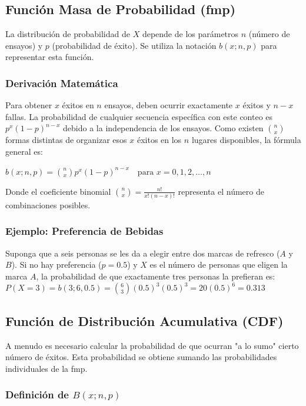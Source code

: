 \documentclass[a4paper]{article}
\begin{document}
\subsection{Función Masa de Probabilidad (fmp)}

La distribución de probabilidad de $X$ depende de los parámetros $n$ (número de ensayos) y $p$ (probabilidad de éxito). Se utiliza la notación $b(x; n, p)$ para representar esta función.

\subsubsection{Derivación Matemática}

Para obtener $x$ éxitos en $n$ ensayos, deben ocurrir exactamente $x$ éxitos y $n - x$ fallas. La probabilidad de cualquier secuencia específica con este conteo es $p^x(1 - p)^{n-x}$ debido a la independencia de los ensayos. Como existen $\binom{n}{x}$ formas distintas de organizar esos $x$ éxitos en los $n$ lugares disponibles, la fórmula general es:

$b(x; n, p) = \binom{n}{x} p^x (1 - p)^{n-x} \quad \text{para } x = 0, 1, 2, \dots, n$

Donde el coeficiente binomial $\binom{n}{x} = \frac{n!}{x!(n-x)!}$ representa el número de combinaciones posibles.

\subsubsection{Ejemplo: Preferencia de Bebidas}

Suponga que a seis personas se les da a elegir entre dos marcas de refresco ($A$ y $B$). Si no hay preferencia ($p = 0.5$) y $X$ es el número de personas que eligen la marca $A$, la probabilidad de que exactamente tres personas la prefieran es:
$P(X = 3) = b(3; 6, 0.5) = \binom{6}{3} (0.5)^3 (0.5)^3 = 20(0.5)^6 = 0.313$

\subsection{Función de Distribución Acumulativa (CDF)}

A menudo es necesario calcular la probabilidad de que ocurran "a lo sumo" cierto número de éxitos. Esta probabilidad se obtiene sumando las probabilidades individuales de la fmp.

\subsubsection{Definición de $B(x; n, p)$}
\end{document}
